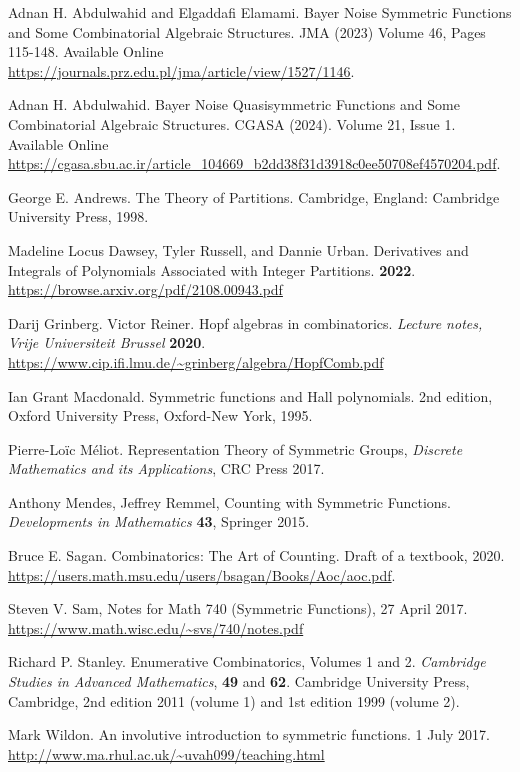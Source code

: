 \documentclass[11pt]{amsart}
\theoremstyle{remark}
\theoremstyle{definition}
\theoremstyle{remark}
\numberwithin{equation}{section}
\begin{document}
\begin{thebibliography}{5}
 Adnan H. Abdulwahid and Elgaddafi Elamami. Bayer Noise Symmetric Functions and
Some Combinatorial Algebraic Structures. JMA (2023)  Volume 46, Pages 115-148. Available Online  \url{https://journals.prz.edu.pl/jma/article/view/1527/1146}.

 Adnan H. Abdulwahid. Bayer Noise Quasisymmetric Functions and Some Combinatorial Algebraic Structures. CGASA (2024). Volume 21, Issue 1. Available Online 
\url{https://cgasa.sbu.ac.ir/article_104669_b2dd38f31d3918c0ee50708ef4570204.pdf}. 	

 George E. Andrews. The Theory of Partitions. Cambridge, England: Cambridge University Press, 1998.

 Madeline Locus Dawsey, Tyler Russell, and Dannie Urban. Derivatives and Integrals of Polynomials Associated
with Integer Partitions. {\bf 2022}.
\url{https://browse.arxiv.org/pdf/2108.00943.pdf}


 Darij Grinberg. Victor Reiner. Hopf algebras in combinatorics. {\it Lecture notes, Vrije Universiteit Brussel} {\bf 2020}.
\url{https://www.cip.ifi.lmu.de/~grinberg/algebra/HopfComb.pdf}

Ian Grant Macdonald.
Symmetric functions and Hall polynomials.
2nd edition, Oxford University Press, Oxford-New York, 1995.

Pierre-Lo\"ic M\'eliot.
Representation Theory
of Symmetric Groups,
{\it Discrete Mathematics and its Applications},
CRC Press 2017.

Anthony Mendes, Jeffrey Remmel,
Counting with Symmetric Functions.
{\it Developments in Mathematics} {\bf 43},
Springer 2015.


 Bruce E. Sagan.
Combinatorics: The Art of Counting.
Draft of a textbook, 2020.
\url{https://users.math.msu.edu/users/bsagan/Books/Aoc/aoc.pdf}.

Steven V. Sam,
Notes for Math 740 (Symmetric Functions),
27 April 2017.
\url{https://www.math.wisc.edu/~svs/740/notes.pdf}

Richard P. Stanley. 
Enumerative Combinatorics, Volumes 1 and 2.
{\it Cambridge Studies in Advanced Mathematics}, {\bf 49} and {\bf 62}.
Cambridge University Press, Cambridge, 2nd edition 2011 (volume 1)
and 1st edition 1999 (volume 2).

 Mark Wildon. An involutive introduction to symmetric functions. 1 July 2017. \url{http://www.ma.rhul.ac.uk/~uvah099/teaching.html}






\end{thebibliography}  
\end{document}
